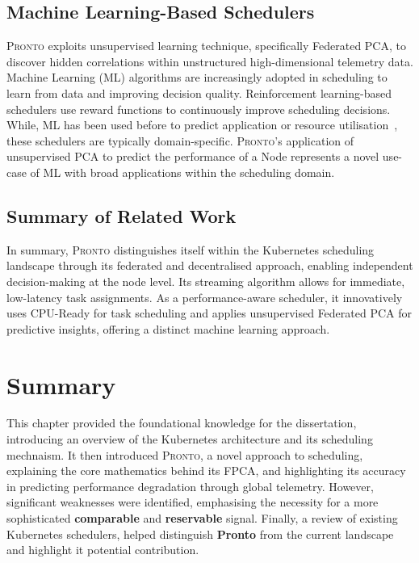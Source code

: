 \subsection{Machine Learning-Based Schedulers}
\textsc{Pronto} exploits unsupervised learning technique, specifically Federated
PCA, to discover hidden correlations within unstructured high-dimensional
telemetry data. Machine Learning (ML) algorithms  are increasingly adopted in
scheduling to learn from data and improving decision quality.
Reinforcement learning-based schedulers \cite{bao2019deep, huang2020rlsk,
peng2021dl2, han2021tailored} use reward functions to continuously improve
scheduling decisions. While, ML has been used before to predict application or
resource utilisation~\cite{yang2019design, carvalho2021qoe,
harichane2020proposal}, these schedulers are typically domain-specific.
\textsc{Pronto}'s application of unsupervised PCA to predict the performance
of a Node represents a novel use-case of ML with broad applications within the
scheduling domain.

\subsection{Summary of Related Work}
In summary, \textsc{Pronto} distinguishes itself within the Kubernetes
scheduling landscape through its federated and decentralised approach, enabling
independent decision-making at the node level. Its streaming algorithm allows
for immediate, low-latency task assignments. As a performance-aware scheduler, it
innovatively uses CPU-Ready for task scheduling and applies unsupervised
Federated PCA for predictive insights, offering a distinct machine learning
approach.

\section{Summary}
This chapter provided the foundational knowledge for the dissertation,
introducing an overview of the Kubernetes architecture and its scheduling
mechnaism. It then introduced \textsc{Pronto}, a novel approach to scheduling,
explaining the core mathematics behind its FPCA, and highlighting its accuracy
in predicting performance degradation through global telemetry. However,
significant weaknesses were identified, emphasising the necessity for a more
sophisticated \textbf{comparable} and \textbf{reservable} signal. Finally, a
review of existing Kubernetes schedulers, helped distinguish \textbf{Pronto}
from the current landscape and highlight it potential contribution.


